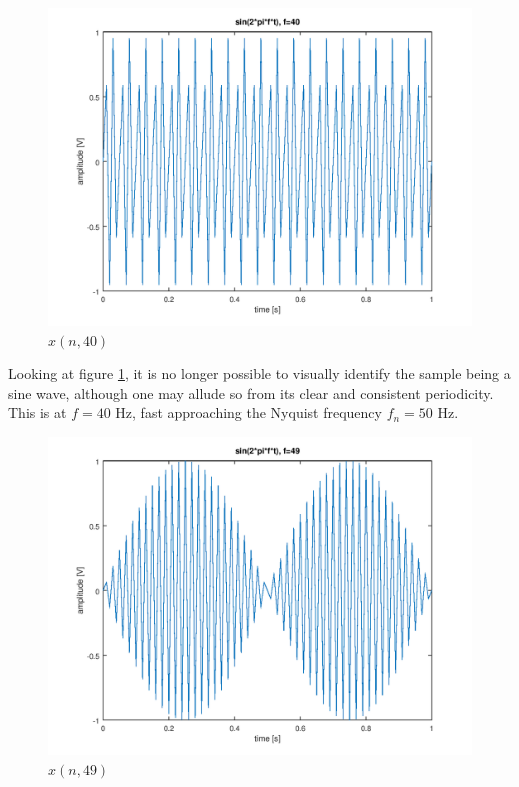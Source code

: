 \documentclass[a4paper, 12pt]{report}
\begin{document}
			\begin{figure}[H]
				\includegraphics[width=\textwidth]{img/1_8.png}
				\caption{$x(n, 40)$}
				\label{fig:8}
			\end{figure}

			Looking at figure \ref{fig:8}, it is no longer possible to visually identify the sample being a sine wave, although one may allude so from its clear and consistent periodicity. This is at $f=40$ Hz, fast approaching the Nyquist frequency $f_n = 50$ Hz.

			\begin{figure}[H]
				\includegraphics[width=\textwidth]{img/1_9.png}
				\caption{$x(n, 49)$}
				\label{fig:9}
			\end{figure}
\end{document}
